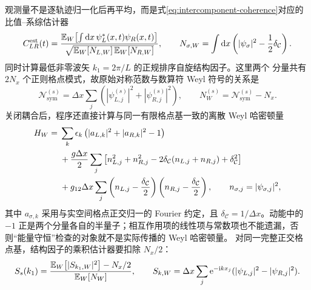 观测量不是逐轨迹归一化后再平均，而是式\eqref{eq:intercomponent-coherence}对应的比值--系综估计器
\begin{equation}
  C_{LR}^{\rm est}(t)=
  \frac{\mathbb{E}_{W}\!\left[\int\mathop{}\!\mathrm{d} x\,\psi_L^*(x,t)\psi_R(x,t)\right]}
  {\sqrt{\mathbb{E}_{W}\!\left[N_{L,W}\right]\mathbb{E}_{W}\!\left[N_{R,W}\right]}},
  \qquad
  N_{\sigma,W}=\int\mathop{}\!\mathrm{d} x\left(|\psi_\sigma|^2-\frac12\delta_{\mathcal C}\right).
  \label{eq:capstone-coherence-estimator}
\end{equation}
同时计算最低非零波矢 $k_1=2\pi/L$ 的正规排序自旋结构因子。这里两个
分量共有 $2N_x$ 个正则格点模式，故原始对称范数与数算符 Weyl 符号的关系是
\begin{equation}
  \mathcal N_{\mathrm{sym}}^{(s)}=\Delta x\sum_j
  (|\psi_{L,j}^{(s)}|^2+|\psi_{R,j}^{(s)}|^2),
  \qquad
  N_W^{(s)}=\mathcal N_{\mathrm{sym}}^{(s)}-N_x.
  \label{eq:capstone-number-symbol}
\end{equation}
关闭耦合后，程序还直接计算与同一有限格点基一致的离散 Weyl 哈密顿量
\begin{align}
  H_W={}&\sum_k\epsilon_k
  \left(|a_{L,k}|^2+|a_{R,k}|^2-1\right) \notag\\
  &+\frac{g\Delta x}{2}\sum_j\left[
  n_{L,j}^2+n_{R,j}^2-2\delta_{\mathcal C}(n_{L,j}+n_{R,j})
  +\delta_{\mathcal C}^2\right] \notag\\
  &+g_{12}\Delta x\sum_j
  \left(n_{L,j}-\frac{\delta_{\mathcal C}}2\right)
  \left(n_{R,j}-\frac{\delta_{\mathcal C}}2\right),
  \qquad n_{\sigma,j}=|\psi_{\sigma,j}|^2,
  \label{eq:capstone-discrete-weyl-hamiltonian}
\end{align}
其中 $a_{\sigma,k}$ 采用与实空间格点正交归一的 Fourier 约定，且
$\delta_{\mathcal C}=1/\Delta x$。动能中的 $-1$ 正是两个分量各自的半量子；相互作用项的线性项与常数项也不能遗漏，否则“能量守恒”检查的对象就不是实际传播的 Weyl 哈密顿量。
对同一完整正交格点基，结构因子的乘积估计器要扣除 $N_x/2$：
\begin{equation}
  S_s(k_1)=\frac{\mathbb{E}_{W}\!\left[|S_{k_1,W}|^2\right]-N_x/2}{\mathbb{E}_{W}\!\left[N_W\right]},
  \qquad
  S_{k,W}=\Delta x\sum_j\mathrm{e}^{-\mathrm{i} kx_j}
  (|\psi_{L,j}|^2-|\psi_{R,j}|^2).
  \label{eq:capstone-spin-structure-estimator}
\end{equation}

